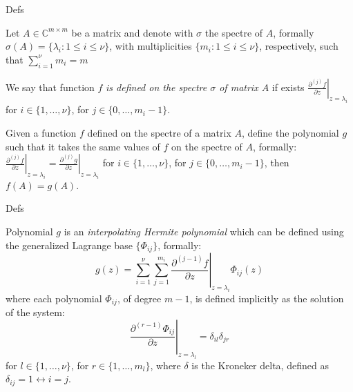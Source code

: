 \documentclass{beamer}
\begin{document}
\begin{frame}{Defs}

Let $A\in\mathbb{C}^{m\times m}$ be a matrix and denote with $\sigma$ the
spectre of $A$, formally $\sigma(A) =
\lbrace \lambda_{i}: 1\leq i\leq \nu\rbrace$, with multiplicities $\lbrace
m_{i}: 1\leq i\leq \nu\rbrace$, respectively, such that
$\sum_{i=1}^{\nu}{m_{i}}=m$

\vfill

We say that function $f$ 
\emph{is defined on the spectre $\sigma$ of matrix $A$} if exists
        $\left. \frac{\partial^{(j)}{f}}{\partial{z}} \right|_{z=\lambda_{i}}$
for $i\in \lbrace 1, \ldots, \nu \rbrace$, for $j \in \lbrace 0, \ldots, m_{i}-1 \rbrace$.    

\vfill

Given a function $f$ defined on the spectre of a matrix $A$, define the polynomial $g$ such that
it takes the same values of $f$ on the spectre of $A$, formally:
        $\left. \frac{\partial^{(j)}{f}}{\partial{z}} \right|_{z=\lambda_{i}} =
        \left. \frac{\partial^{(j)}{g}}{\partial{z}} \right|_{z=\lambda_{i}}$
for $i\in \lbrace 1, \ldots, \nu \rbrace$, for $j \in \lbrace 0, \ldots, m_{i}-1 \rbrace$,
then $f(A) = g(A)$. 

\end{frame}

\begin{frame}{Defs}

\vfill

Polynomial $g$ is an \emph{interpolating Hermite polynomial} which
can be defined using the generalized Lagrange base $ \lbrace \Phi_{ij} \rbrace$, formally:
\begin{displaymath}
g(z) = \sum_{i=1}^{\nu}{\sum_{j=1}^{m_{i}}{
        \left. \frac{\partial^{(j-1)}{f}}{\partial{z}} \right|_{z=\lambda_{i}}\Phi_{ij}(z)
    }}
\end{displaymath}
where each polynomial $\Phi_{ij}$, of degree $m-1$, is defined implicitly as the solution of the system:
\begin{displaymath}
    \left. \frac{\partial^{(r-1)}{\Phi_{ij}}}{\partial{z}} \right|_{z=\lambda_{l}} = \delta_{il}\delta_{jr}
\end{displaymath}
for $l\in \lbrace 1, \ldots, \nu \rbrace$, for $r \in \lbrace 1, \ldots, m_{l} \rbrace$, where
$\delta$ is the Kroneker delta, defined as $\delta_{ij}=1 \leftrightarrow i=j$.
\end{frame}
\end{document}
